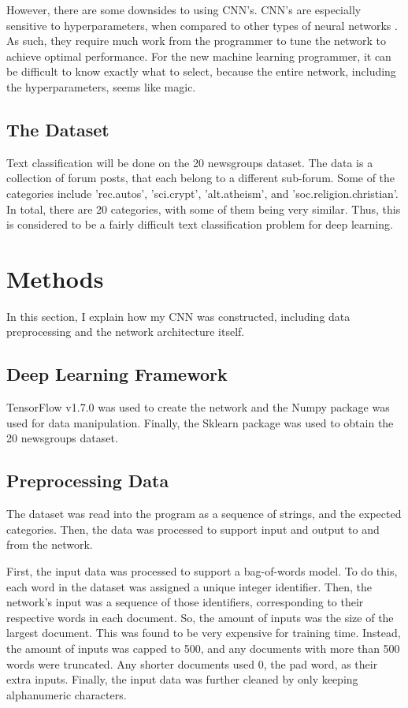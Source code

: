 \documentclass{article}
\begin{document}
However, there are some downsides to using CNN's. CNN's are especially sensitive to hyperparameters, when compared to other types of neural
networks \cite{zhangwallace}. As such, they require much work from the programmer to tune the network
to achieve optimal performance. For the new machine learning programmer, it can be difficult to know exactly what to select, because the
entire network, including the hyperparameters, seems like magic.

\subsection{The Dataset}
Text classification will be done on the 20 newsgroups dataset. The data is a collection of forum posts, that each belong to a
different sub-forum. Some of the categories include 'rec.autos', 'sci.crypt', 'alt.atheism', and 'soc.religion.christian'. In total, there
are 20 categories, with some of them being very similar. Thus, this is considered to be a fairly difficult text classification problem for
deep learning.

\section{Methods}
In this section, I explain how my CNN was constructed, including data preprocessing and the network architecture itself.

\subsection{Deep Learning Framework}
TensorFlow v1.7.0 was used to create the network and the Numpy package was used for data manipulation. Finally, the Sklearn package was used
to obtain the 20 newsgroups dataset.

\subsection{Preprocessing Data}
The dataset was read into the program as a sequence of strings, and the expected categories. Then, the data was processed to support input
and output to and from the network.

First, the input data was processed to support a bag-of-words model. To do this, each word in the dataset was assigned a unique integer
identifier. Then, the network's input was a sequence of those identifiers, corresponding to their respective words in each document. So,
the amount of inputs was the size of the largest document. This was found to be very expensive for training time. Instead, the
amount of inputs was capped to 500, and any documents with more than 500 words were truncated. Any shorter documents used 0, the pad word,
as their extra inputs. Finally, the input data was further cleaned by only keeping alphanumeric characters.
\end{document}
